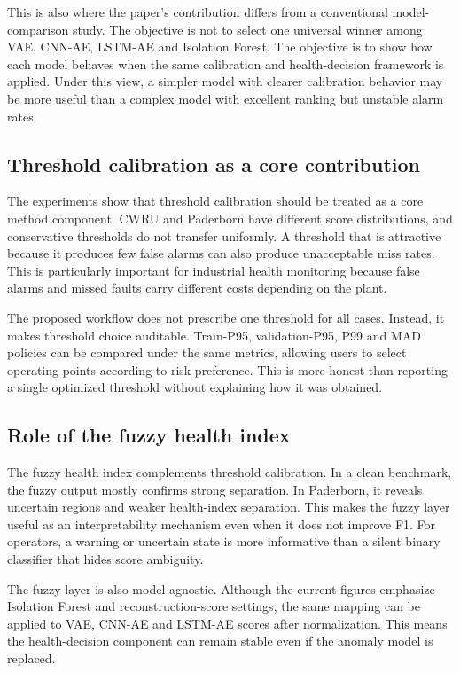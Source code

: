 \documentclass[pdflatex,sn-mathphys-num]{sn-jnl}
\begin{document}
This is also where the paper's contribution differs from a conventional model-comparison study. The objective is not to select one universal winner among VAE, CNN-AE, LSTM-AE and Isolation Forest. The objective is to show how each model behaves when the same calibration and health-decision framework is applied. Under this view, a simpler model with clearer calibration behavior may be more useful than a complex model with excellent ranking but unstable alarm rates.

\subsection{Threshold calibration as a core contribution}

The experiments show that threshold calibration should be treated as a core method component. CWRU and Paderborn have different score distributions, and conservative thresholds do not transfer uniformly. A threshold that is attractive because it produces few false alarms can also produce unacceptable miss rates. This is particularly important for industrial health monitoring because false alarms and missed faults carry different costs depending on the plant.

The proposed workflow does not prescribe one threshold for all cases. Instead, it makes threshold choice auditable. Train-P95, validation-P95, P99 and MAD policies can be compared under the same metrics, allowing users to select operating points according to risk preference. This is more honest than reporting a single optimized threshold without explaining how it was obtained.

\subsection{Role of the fuzzy health index}

The fuzzy health index complements threshold calibration. In a clean benchmark, the fuzzy output mostly confirms strong separation. In Paderborn, it reveals uncertain regions and weaker health-index separation. This makes the fuzzy layer useful as an interpretability mechanism even when it does not improve F1. For operators, a warning or uncertain state is more informative than a silent binary classifier that hides score ambiguity.

The fuzzy layer is also model-agnostic. Although the current figures emphasize Isolation Forest and reconstruction-score settings, the same mapping can be applied to VAE, CNN-AE and LSTM-AE scores after normalization. This means the health-decision component can remain stable even if the anomaly model is replaced.
\end{document}
